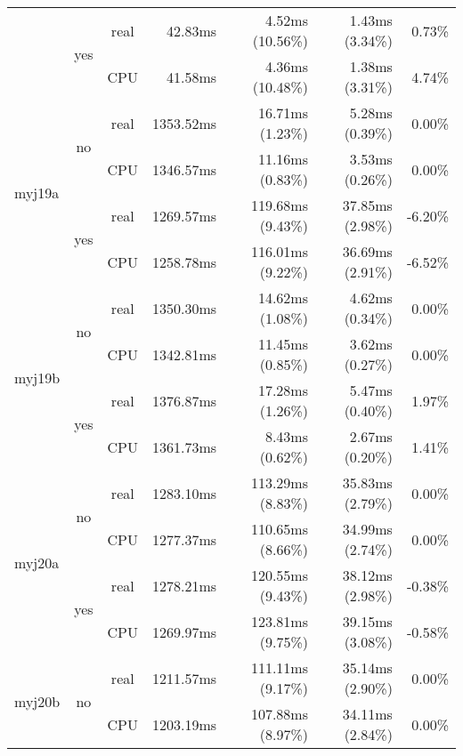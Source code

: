 \documentclass[en]{pracamgr}
\begin{document}
\begin{appendices}
\begin{small}
\begin{longtable}{|l|c|c|r|r|r|r|}
                          \cline{2-7}
                          & \multirow{2}{*}{yes} & real & 42.83ms & 4.52ms (10.56\%) & 1.43ms (3.34\%) & 0.73\% \\*
                          &                      & CPU  & 41.58ms & 4.36ms (10.48\%) & 1.38ms (3.31\%) & 4.74\% \\
\hline
\multirow{4}{*}{myj19a}   & \multirow{2}{*}{no}  & real & 1353.52ms & 16.71ms (1.23\%) & 5.28ms (0.39\%) & 0.00\% \\*
                          &                      & CPU  & 1346.57ms & 11.16ms (0.83\%) & 3.53ms (0.26\%) & 0.00\% \\*
                          \cline{2-7}
                          & \multirow{2}{*}{yes} & real & 1269.57ms & 119.68ms (9.43\%) & 37.85ms (2.98\%) & -6.20\% \\*
                          &                      & CPU  & 1258.78ms & 116.01ms (9.22\%) & 36.69ms (2.91\%) & -6.52\% \\
\hline
\multirow{4}{*}{myj19b}   & \multirow{2}{*}{no}  & real & 1350.30ms & 14.62ms (1.08\%) & 4.62ms (0.34\%) & 0.00\% \\*
                          &                      & CPU  & 1342.81ms & 11.45ms (0.85\%) & 3.62ms (0.27\%) & 0.00\% \\*
                          \cline{2-7}
                          & \multirow{2}{*}{yes} & real & 1376.87ms & 17.28ms (1.26\%) & 5.47ms (0.40\%) & 1.97\% \\*
                          &                      & CPU  & 1361.73ms & 8.43ms (0.62\%) & 2.67ms (0.20\%) & 1.41\% \\
\hline
\multirow{4}{*}{myj20a}   & \multirow{2}{*}{no}  & real & 1283.10ms & 113.29ms (8.83\%) & 35.83ms (2.79\%) & 0.00\% \\*
                          &                      & CPU  & 1277.37ms & 110.65ms (8.66\%) & 34.99ms (2.74\%) & 0.00\% \\*
                          \cline{2-7}
                          & \multirow{2}{*}{yes} & real & 1278.21ms & 120.55ms (9.43\%) & 38.12ms (2.98\%) & -0.38\% \\*
                          &                      & CPU  & 1269.97ms & 123.81ms (9.75\%) & 39.15ms (3.08\%) & -0.58\% \\
\hline
\multirow{4}{*}{myj20b}   & \multirow{2}{*}{no}  & real & 1211.57ms & 111.11ms (9.17\%) & 35.14ms (2.90\%) & 0.00\% \\*
                          &                      & CPU  & 1203.19ms & 107.88ms (8.97\%) & 34.11ms (2.84\%) & 0.00\% \\*

\end{longtable}
\end{small}
\end{appendices}
\end{document}
